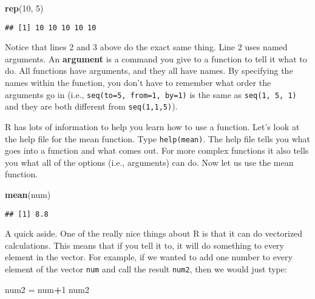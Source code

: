 \documentclass[]{book}
\newenvironment{Shaded}{\begin{snugshade}}{\end{snugshade}}
\newcommand{\KeywordTok}[1]{\textcolor[rgb]{0.13,0.29,0.53}{\textbf{#1}}}
\newcommand{\DecValTok}[1]{\textcolor[rgb]{0.00,0.00,0.81}{#1}}
\newcommand{\StringTok}[1]{\textcolor[rgb]{0.31,0.60,0.02}{#1}}
\newcommand{\OperatorTok}[1]{\textcolor[rgb]{0.81,0.36,0.00}{\textbf{#1}}}
\newcommand{\NormalTok}[1]{#1}
\theoremstyle{definition}
\theoremstyle{definition}
\theoremstyle{definition}
\theoremstyle{remark}
\begin{document}
\begin{Shaded}
\begin{Highlighting}[]
\KeywordTok{rep}\NormalTok{(}\DecValTok{10}\NormalTok{, }\DecValTok{5}\NormalTok{)}
\end{Highlighting}
\end{Shaded}

\begin{verbatim}
## [1] 10 10 10 10 10
\end{verbatim}

Notice that lines 2 and 3 above do the exact same thing. Line 2 uses
named arguments. An \textbf{argument} is a command you give to a
function to tell it what to do. All functions have arguments, and they
all have names. By specifying the names within the function, you don't
have to remember what order the arguments go in (i.e.,
\texttt{seq(to=5,\ from=1,\ by=1)} is the same as
\texttt{seq(1,\ 5,\ 1)} and they are both different from
\texttt{seq(1,1,5)}).

R has lots of information to help you learn how to use a function. Let's
look at the help file for the mean function. Type \texttt{help(mean)}.
The help file tells you what goes into a function and what comes out.
For more complex functions it also tells you what all of the options
(i.e., arguments) can do. Now let us use the mean function.

\begin{Shaded}
\begin{Highlighting}[]
\KeywordTok{mean}\NormalTok{(num)}
\end{Highlighting}
\end{Shaded}

\begin{verbatim}
## [1] 8.8
\end{verbatim}

A quick aside. One of the really nice things about R is that it can do
vectorized calculations. This means that if you tell it to, it will do
something to every element in the vector. For example, if we wanted to
add one number to every element of the vector \texttt{num} and call the
result \texttt{num2}, then we would just type:

\begin{Shaded}
\begin{Highlighting}[]
\NormalTok{num2 =}\StringTok{ }\NormalTok{num}\OperatorTok{+}\DecValTok{1}
\NormalTok{num2}
\end{Highlighting}
\end{Shaded}
\end{document}
